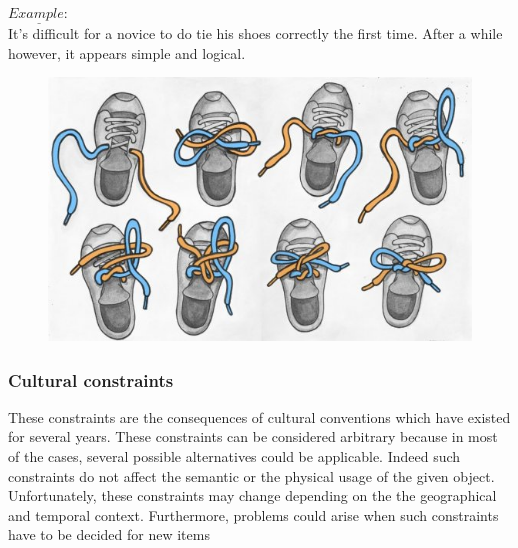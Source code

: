 \documentclass[a4paper,11pt] {article}
\theoremstyle{definition}
\begin{document}
        $\underline{Example:}$\\
        It's difficult for a novice to do tie his shoes correctly the first time. After a while however, it appears simple and logical.
        \begin{figure}[h]
        \centering
        \includegraphics[scale=0.3]{fig-report/tie_your_shoes.jpg}
        \end{figure}

        \subsubsection{Cultural constraints}
        These constraints are the consequences of cultural conventions which have existed for several years. These constraints can be considered arbitrary because in most of the cases, several possible alternatives could be applicable. Indeed such constraints do not affect the semantic or the physical usage of the given object. Unfortunately, these constraints may change depending on the the geographical and temporal context. Furthermore, problems could arise when such constraints have to be decided for new items\\
\end{document}
